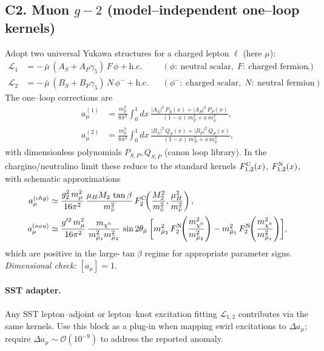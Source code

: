 \documentclass[11pt]{article}
\begin{document}
      \subsection*{C2. Muon $g-2$ (model--independent one--loop kernels)}
          Adopt two universal Yukawa structures for a charged lepton $\ell$ (here $\mu$):
          \begin{align}
          \mathcal L_1 &= -\,\bar\mu\,(A_S + A_P\gamma_5)\,F\,\phi + \text{h.c.}
          && (\phi:\ \text{neutral scalar},\; F:\ \text{charged fermion}),\\
          \mathcal L_2 &= -\,\bar\mu\,(B_S + B_P\gamma_5)\,N\,\phi^- + \text{h.c.}
          && (\phi^-:\ \text{charged scalar},\; N:\ \text{neutral fermion}).
          \end{align}
          The one--loop corrections are
          \begin{align}
          a_\mu^{(1)} &= \frac{m_\mu^2}{8\pi^2}\!\int_0^1\!dx\,
          \frac{|A_S|^2\,P_S(x)+|A_P|^2\,P_P(x)}{(1-x)\,m_F^2 + x\,m_\phi^2},\\[2pt]
          a_\mu^{(2)} &= \frac{m_\mu^2}{8\pi^2}\!\int_0^1\!dx\,
          \frac{|B_S|^2\,Q_S(x)+|B_P|^2\,Q_P(x)}{(1-x)\,m_N^2 + x\,m_\phi^2},
          \end{align}
          with dimensionless polynomials $P_{S,P},Q_{S,P}$ (canon loop library). In the chargino/neutralino limit these reduce to the standard kernels $F^{\textrm C}_{1,2}(x)$, $F^{\textrm N}_{1,2}(x)$, with schematic approximations
          \begin{align}
          a_\mu^{\textrm (chg)} &\simeq
          \frac{g_2^2\,m_\mu^2}{16\pi^2}\,
          \frac{\mu_H M_2\,\tan\beta}{m_{\tilde\nu}^2}\,
          F^{\textrm C}_2\!\!\left(\frac{M_2^2}{m_{\tilde\nu}^2},\frac{\mu_H^2}{m_{\tilde\nu}^2}\right),\\[2pt]
          a_\mu^{\textrm (neu)} &\simeq
          \frac{g'^2\,m_\mu^2}{16\pi^2}\,
          \frac{m_{\chi^0}}{m_{\tilde\mu_1}^2 m_{\tilde\mu_2}^2}\,
          \sin 2\theta_{\tilde\mu}\,
          \biggl[
              m_{\tilde\mu_2}^2\,F^{\textrm N}_2\!\!\left(\frac{m_{\chi^0}^2}{m_{\tilde\mu_2}^2}\right)
              - m_{\tilde\mu_1}^2\,F^{\textrm N}_2\!\!\left(\frac{m_{\chi^0}^2}{m_{\tilde\mu_1}^2}\right)
              \biggr],
          \end{align}
          which are positive in the large-$\tan\beta$ regime for appropriate parameter signs. \textit{Dimensional check:} $[a_\mu]=1$.

          \paragraph{SST adapter.} Any SST lepton–adjoint or lepton–knot excitation fitting $\mathcal L_{1,2}$ contributes via the same kernels. Use this block as a plug-in when mapping swirl excitations to $\Delta a_\mu$; require $\Delta a_\mu\sim\mathcal O(10^{-9})$ to address the reported anomaly.
\end{document}
